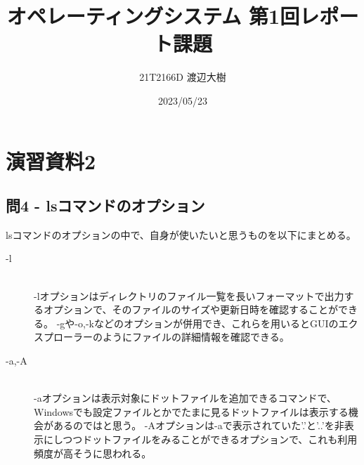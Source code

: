 \documentclass[a4paper,11pt]{jsarticle}
\begin{document}
\title{オペレーティングシステム 第1回レポート課題}
\author{21T2166D 渡辺大樹}
\date{2023/05/23}
\maketitle

\section*{演習資料2}
\subsection*{問4 - lsコマンドのオプション}
lsコマンドのオプションの中で、自身が使いたいと思うものを以下にまとめる。
\begin{description}
    \item[-l] \mbox{}\\
    -lオプションはディレクトリのファイル一覧を長いフォーマットで出力するオプションで、そのファイルのサイズや更新日時を確認することができる。
    -gや-o,-kなどのオプションが併用でき、これらを用いるとGUIのエクスプローラーのようにファイルの詳細情報を確認できる。
    \item[-a,-A] \mbox{}\\
    -aオプションは表示対象にドットファイルを追加できるコマンドで、Windowsでも設定ファイルとかでたまに見るドットファイルは表示する機会があるのではと思う。
    -Aオプションは-aで表示されていた'.'と'..'を非表示にしつつドットファイルをみることができるオプションで、これも利用頻度が高そうに思われる。
    \item[] \mbox{}\\
    
    \item[] \mbox{}\\
    
    \item[] \mbox{}\\
    
\end{description}
\end{document}
